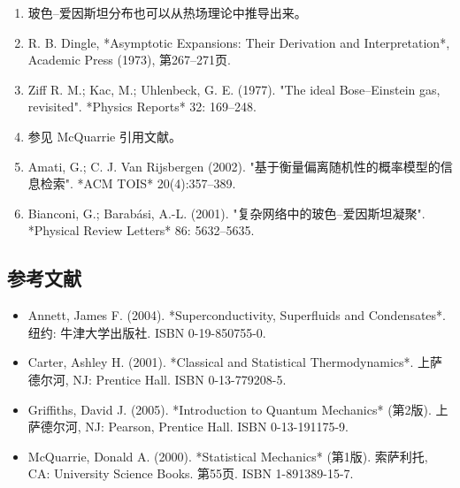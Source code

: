 \begin{enumerate}
\item 玻色–爱因斯坦分布也可以从热场理论中推导出来。
\item R. B. Dingle, *Asymptotic Expansions: Their Derivation and Interpretation*, Academic Press (1973), 第267–271页.
\item Ziff R. M.; Kac, M.; Uhlenbeck, G. E. (1977). "The ideal Bose–Einstein gas, revisited". *Physics Reports* 32: 169–248.
\item 参见 McQuarrie 引用文献。
\item Amati, G.; C. J. Van Rijsbergen (2002). "基于衡量偏离随机性的概率模型的信息检索". *ACM TOIS* 20(4):357–389.
\item Bianconi, G.; Barabási, A.-L. (2001). "复杂网络中的玻色–爱因斯坦凝聚". *Physical Review Letters* 86: 5632–5635.
\end{enumerate}
\subsection{参考文献}
\begin{itemize}
\item Annett, James F. (2004). *Superconductivity, Superfluids and Condensates*. 纽约: 牛津大学出版社. ISBN 0-19-850755-0.
\item Carter, Ashley H. (2001). *Classical and Statistical Thermodynamics*. 上萨德尔河, NJ: Prentice Hall. ISBN 0-13-779208-5.
\item Griffiths, David J. (2005). *Introduction to Quantum Mechanics* (第2版). 上萨德尔河, NJ: Pearson, Prentice Hall. ISBN 0-13-191175-9.
\item McQuarrie, Donald A. (2000). *Statistical Mechanics* (第1版). 索萨利托, CA: University Science Books. 第55页. ISBN 1-891389-15-7.
\end{itemize}